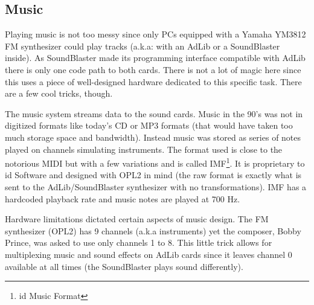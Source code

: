 \subsection{Music}
Playing music is not too messy since only PCs equipped with a Yamaha YM3812 FM synthesizer could play tracks (a.k.a: with an AdLib or a SoundBlaster inside). As SoundBlaster made its programming interface compatible with AdLib there is only one code path to both cards. There is not a lot of magic here since this uses a piece of well-designed hardware dedicated to this specific task. There are a few cool tricks, though.\\
\par
The music system streams data to the sound cards. Music in the 90's was not in digitized formats like today's CD or MP3 formats (that would have taken too much storage space and bandwidth). Instead music was stored as series of notes played on channels simulating instruments. The format used is close to the notorious MIDI but with a few variations and is called IMF\footnote{id Music Format}. It is proprietary to id Software and designed with OPL2 in mind (the raw format is exactly what is sent to the AdLib/SoundBlaster synthesizer with no transformations). IMF has a hardcoded playback rate and music notes are played at 700 Hz.\\
\par
Hardware limitations dictated certain aspects of music design. The FM synthesizer (OPL2) has 9 channels (a.k.a instruments) yet the composer, Bobby Prince, was asked to use only channels 1 to 8. This little trick allows for multiplexing music and sound effects on AdLib cards since it leaves channel 0 available at all times (the SoundBlaster plays sound differently).\\





